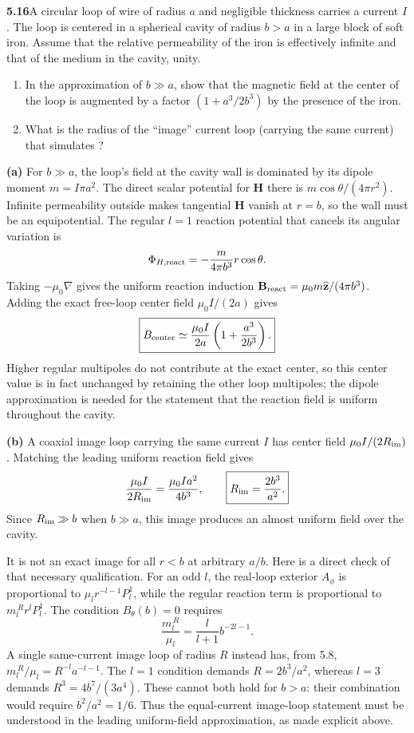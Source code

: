 \par\bigskip
\noindent\textbf{5.16}\quad A circular loop of wire of radius $a$ and negligible thickness carries a current $I$. The loop is centered in a spherical cavity of radius $b>a$ in a large block of soft iron. Assume that the relative permeability of the iron is effectively infinite and that of the medium in the cavity, unity.
\begin{enumerate}
\item[(a)] In the approximation of $b\gg a$, show that the magnetic field at the center of the loop is augmented by a factor $(1+a^{3}/2b^{3})$ by the presence of the iron.
\item[(b)] What is the radius of the ``image'' current loop (carrying the same current) that simulates ? 
\end{enumerate}
\solution
\textbf{(a)} For $b\gg a$, the loop's field at the cavity wall is
dominated by its dipole moment $m=I\pi a^2$. The direct scalar potential
for $\mathbf H$ there is $m\cos\theta/(4\pi r^2)$.
Infinite permeability outside makes tangential $\mathbf H$ vanish
at $r=b$, so the wall must be an equipotential. The regular $l=1$
reaction potential that cancels its angular variation is
\[
\Phi_{H,\rm react}=-\frac{m}{4\pi b^3}r\cos\theta.
\]
Taking $-\mu_0\nabla$ gives the uniform reaction induction
$\mathbf B_{\rm react}=\mu_0m\widehat{\mathbf z}/(4\pi b^3)$.
Adding the exact free-loop center field $\mu_0I/(2a)$ gives
\[
\boxed{B_{\rm center}\simeq\frac{\mu_0I}{2a}
\left(1+\frac{a^3}{2b^3}\right).}
\]
Higher regular multipoles do not contribute at the exact center, so
this center value is in fact unchanged by retaining the other loop
multipoles; the dipole approximation is needed for the statement that
the reaction field is uniform throughout the cavity.

\textbf{(b)} A coaxial image loop carrying the same current $I$ has
center field $\mu_0I/(2R_{\rm im})$. Matching the leading uniform
reaction field gives
\[
\frac{\mu_0I}{2R_{\rm im}}=\frac{\mu_0Ia^2}{4b^3},\qquad
\boxed{R_{\rm im}=\frac{2b^3}{a^2}.}
\]
Since $R_{\rm im}\gg b$ when $b\gg a$, this image produces an almost
uniform field over the cavity.

It is not an exact image for all $r<b$ at arbitrary $a/b$.
Here is a direct check of that necessary qualification.
For an odd $l$, the real-loop exterior $A_\phi$ is proportional to
$\mu_l r^{-l-1}P_l^1$, while the regular reaction term is proportional
to $m_l^{\,R}r^lP_l^1$. The condition $B_\theta(b)=0$ requires
\[
\frac{m_l^{\,R}}{\mu_l}=\frac{l}{l+1}b^{-2l-1}.
\]
A single same-current image loop of radius $R$ instead has, from 5.8,
$m_l^{\,R}/\mu_l=R^{-l}a^{-l-1}$.
The $l=1$ condition demands $R=2b^3/a^2$, whereas $l=3$ demands
$R^3=4b^7/(3a^4)$. These cannot both hold for $b>a$:
their combination would require $b^2/a^2=1/6$.
Thus the equal-current image-loop statement must be understood in
the leading uniform-field approximation, as made explicit above.


